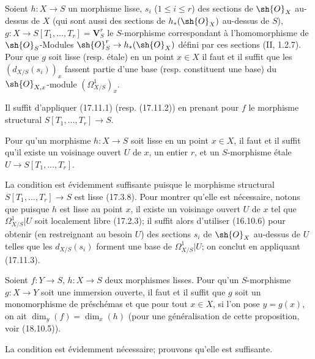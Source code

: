 \begin{corollary}[17.11.3]
\label{IV.17.11.3}
Soient $h:X\to S$ un morphisme lisse, $s_i$ ($1\leq i\leq r$) des sections de $\sh{O}_X$ au-dessus de $X$ (qui sont aussi des sections de $h_*(\sh{O}_X)$ au-dessus de $S$), $g:X\to S[T_1,\ldots,T_r]=\mathbf{V}_S^r$ le $S$-morphisme correspondant à l'homomorphisme de $\sh{O}_S$-Modules $\sh{O}_S^r\to h_*(\sh{O}_X)$ défini par ces sections (II, 1.2.7). Pour que $g$ soit lisse (resp. étale) en un point $x\in X$ il faut et il suffit que les $(d_{X/S}(s_i))_x$ fassent partie d'une base (resp. constituent une base) du $\sh{O}_{X,x}$-module $(\Omega^1_{X/S})_x$.
\end{corollary}

Il suffit d'appliquer (17.11.1) (resp. (17.11.2)) en prenant pour $f$ le morphisme structural $S[T_1,\ldots,T_r]\to S$.

\begin{corollary}[17.11.4]
\label{IV.17.11.4}
Pour qu'un morphisme $h:X\to S$ soit lisse en un point $x\in X$, il faut et il suffit qu'il existe un voisinage ouvert $U$ de $x$, un entier $r$, et un $S$-morphisme étale $U\to S[T_1,\ldots,T_r]$.
\end{corollary}


La condition est évidemment suffisante puisque le morphisme structural $S[T_1,\ldots,T_r]\to S$ est lisse (17.3.8). Pour montrer qu'elle est nécessaire, notons que puisque $h$ est lisse au point $x$, il existe un voisinage ouvert $U$ de $x$ tel que $\Omega^1_{X/S}|U$ soit localement libre (17.2.3); il suffit alors d'utiliser (16.10.6) pour obtenir (en restreignant au besoin $U$) des sections $s_i$ de $\sh{O}_X$ au-dessus de $U$ telles que les $d_{X/S}(s_i)$ forment une base de $\Omega^1_{X/S}|U$; on conclut en appliquant (17.11.3).

\begin{proposition}[17.11.5]
\label{IV.17.11.5}
Soient $f:Y\to S$, $h:X\to S$ deux morphismes lisses. Pour qu'un $S$-morphisme $g:X\to Y$ soit une immersion ouverte, il faut et il suffit que $g$ soit un monomorphisme de préschémas et que pour tout $x\in X$, si l'on pose $y=g(x)$, on ait $\dim_y(f)=\dim_x(h)$ (pour une généralisation de cette proposition, voir (18.10.5)).
\end{proposition}

La condition est évidemment nécessaire; prouvons qu'elle est suffisante.

